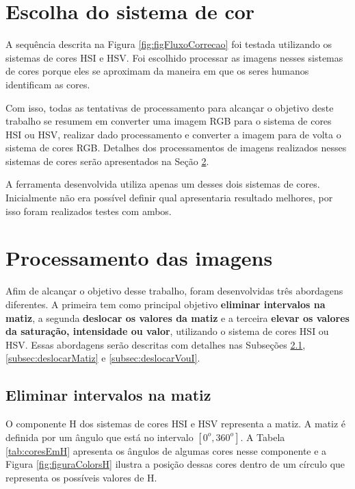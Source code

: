 \documentclass[	12pt, Times, openright, twoside, a4paper, english, brazil]{abntex2}
\begin{document}
\section{Escolha do sistema de cor}

A sequência descrita na Figura \ref{fig:figFluxoCorrecao} foi testada utilizando os sistemas de cores HSI e HSV. Foi escolhido processar as imagens nesses sistemas de cores porque eles se aproximam da maneira em que os seres humanos identificam as cores. 

Com isso, todas as tentativas de processamento para alcançar o objetivo deste trabalho se resumem em converter uma imagem RGB para o sistema de cores HSI ou HSV, realizar dado processamento e converter a imagem para de volta o sistema de cores RGB. Detalhes dos processamentos de imagens realizados nesses sistemas de cores serão apresentados na Seção \ref{sec:processamentoDasImagens}.

A ferramenta desenvolvida utiliza apenas um desses dois sistemas de cores. Inicialmente não era possível definir qual apresentaria resultado melhores, por isso foram realizados testes com ambos.

\section{Processamento das imagens}
\label{sec:processamentoDasImagens}

Afim de alcançar o objetivo desse trabalho, foram desenvolvidas três abordagens diferentes. A primeira tem como principal objetivo \textbf{eliminar intervalos na matiz}, a segunda \textbf{deslocar os valores da matiz} e a terceira \textbf{elevar os valores da saturação, intensidade ou valor}, utilizando o sistema de cores HSI ou HSV. Essas abordagens serão descritas com detalhes nas Subseções \ref{subsec:eliminarIntervalosH}, \ref{subsec:deslocarMatiz} e \ref{subsec:deslocarVouI}.

\subsection{Eliminar intervalos na matiz}
\label{subsec:eliminarIntervalosH}

O componente H dos sistemas de cores HSI e HSV representa a matiz. A matiz é definida por um ângulo que está no intervalo $[0^o, 360^o]$. A Tabela \ref{tab:coresEmH} apresenta os ângulos de algumas cores nesse componente e a Figura \ref{fig:figuraColorsH} ilustra a posição dessas cores dentro de um círculo que representa os possíveis valores de H.
\end{document}
